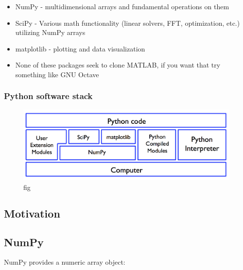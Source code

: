 \documentclass[12pt,letterpaper,twoside]{article}
\begin{document}
\begin{itemize}
\item
  NumPy - multidimensional arrays and fundamental operations on them
\item
  SciPy - Various math functionality (linear solvers, FFT, optimization,
  etc.) utilizing NumPy arrays
\item
  matplotlib - plotting and data visualization
\item
  None of these packages seek to clone MATLAB, if you want that try
  something like GNU Octave
\end{itemize}

\hypertarget{python-software-stack}{%
\subsubsection{Python software stack}\label{python-software-stack}}

\begin{figure}[h]
\centering
\includegraphics[scale=0.45]{fig/python-stack.png}
\caption{fig}
\end{figure}



\subsection{Motivation}


\hypertarget{numpy}{%
\subsection{NumPy}\label{numpy}}

NumPy provides a numeric array object:

\begin{python}
\begin{Highlighting}[]
\OperatorTok{=}\NormalTok{ np.array([}\NormalTok{, }\NormalTok{, }\NormalTok{])}
\end{Highlighting}
\end{python}
\end{document}
